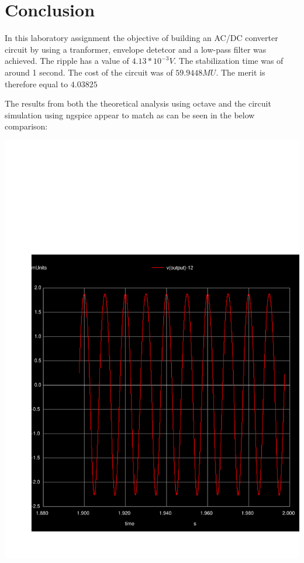 \section{Conclusion}
\label{sec:conclusion}

In this laboratory assignment the objective of building an AC/DC converter circuit by using a tranformer, envelope detetcor and a low-pass filter was achieved.
 The ripple has a value of $4.13*10^{-3} V$.
 The stabilization time was of around 1 second.
 The cost of the circuit was of $59.9448 MU$.
 The merit is therefore equal to $4.03825$
 
The results from both the theoretical analysis using octave and the circuit
simulation using ngspice appear to match as can be seen in the below comparison:

\begin{minipage}[c]{0.50\linewidth}
\includegraphics[width=1\linewidth]{../sim/v12.pdf}
\end{minipage} %
